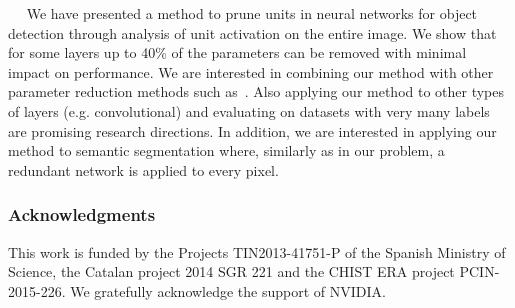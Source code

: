 \documentclass{article}
\newcommand{\minisection}[1]{\vspace{0.04in} \noindent {\bf #1}\ \ }
\begin{document}
\minisection{Conclusions.} We have presented a method to prune units
in neural networks for object detection through analysis of unit
activation on the entire image. We show that for some layers up to
40\% of the parameters can be removed with minimal impact on
performance. We are interested in combining our method with other
parameter reduction methods such as~\cite{xue2013restructuring}. Also
applying our method to other types of layers (e.g. convolutional) and
evaluating on datasets with very many labels are promising research
directions. In addition, we are interested in applying our method to semantic segmentation where, similarly as in our problem, a redundant network is applied to every pixel.

\subsubsection*{Acknowledgments}
This work is funded by the Projects TIN2013-41751-P of the Spanish Ministry of Science, the Catalan project 2014 SGR 221 and the CHIST ERA project PCIN-2015-226. We gratefully acknowledge the support of NVIDIA.



\end{document}
